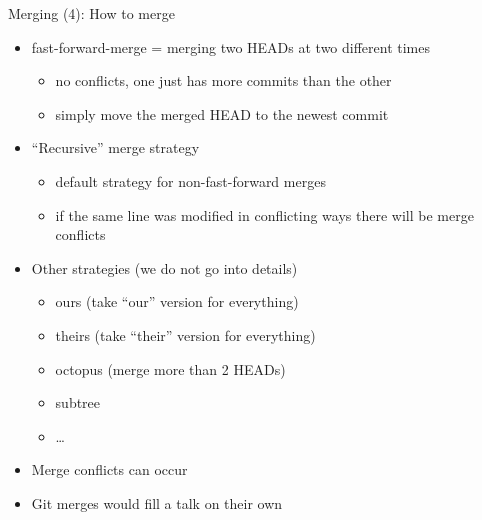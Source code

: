 \begin{frame}[fragile]{Merging (4): How to merge}
  \begin{itemize}
    
    \item fast-forward-merge = merging two HEADs at two different times
    \begin{itemize}
      \item no conflicts, one just has more commits than the other
      \item simply move the merged HEAD to the newest commit
    \end{itemize}
    
    \item ``Recursive'' merge strategy
    \begin{itemize}
      \item default strategy for non-fast-forward merges
      \item if the same line was modified in conflicting ways there will be merge conflicts
    \end{itemize}
    
    \item Other strategies (we do not go into details)
    \begin{itemize}
      \item ours (take ``our'' version for everything)
      \item theirs (take ``their'' version for everything)
      \item octopus (merge more than 2 HEADs)
      \item subtree
      \item \dots
    \end{itemize}
    
    \item Merge conflicts can occur
    \item Git merges would fill a talk on their own
  \end{itemize}
\end{frame}

